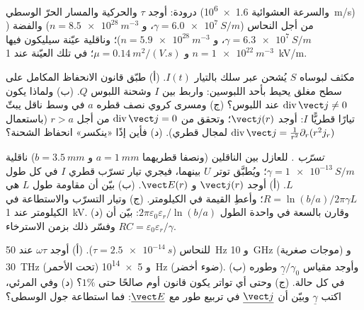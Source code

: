 \begin{exercise}[$\star$]\label{exo:b2:charges-currents-conduction:4}
درودة: أوجد $\tau$ والحركية والمسار الحرّ الوسطي (والسرعة العشوائية \qty{1.6e6}{m/s})
من أجل النحاس ($\gamma = \qty{6.0e7}{S/m}$، و $n = \qty{8.5e28}{m^{-3}}$) والفضة
($\gamma = \qty{6.3e7}{S/m}$، و $n = \qty{5.9e28}{m^{-3}}$)؛ وناقلية عيّنة
سيليكون فيها $n = \qty{1e22}{m^{-3}}$ و $\mu = \qty{0.14}{m^2/(V.s)}$؛
 في تلك العيّنة عند \qty{1}{kV/m}.
\end{exercise}

\begin{exercise}[$\star\star$]\label{exo:b2:charges-currents-conduction:5}
مكثف لبوساه $S$ يُشحن عبر سلك بالتيار $I(t)$. (أ) طبّق
قانون الانحفاظ المكامل على سطح مغلق يحيط بأحد اللبوسين:
واربط بين $I$ وشحنة اللبوس $Q$. (ب) ولماذا يكون $\operatorname{div}\vect j \ne 0$
عند اللبوس؟ (ج) ومسرى كروي نصف قطره $a$ في وسط ناقل
يبثّ تيارًا قطريًّا $I$: أوجد $\vect j(r)$؛ وتحقق من $\operatorname{div}
\vect j = 0$ من أجل $r > a$ (باستعمال $\operatorname{div}\vect j = \frac1{r^2}\partial_r(r^2j_r)$
لمجال قطري). (د) فأين إذًا «ينكسر» انحفاظ
الشحنة؟
\end{exercise}

\begin{exercise}[$\star\star$]\label{exo:b2:charges-currents-conduction:6}
\emph{تسرّب .} للعازل بين الناقلين
(ونصفا قطريهما $a = \qty{1}{mm}$ و $b = \qty{3.5}{mm}$) ناقلية $\gamma = \qty{1e-13}{S/m}$؛
ويُطبَّق توتر $U$ بينهما، فيجري تيار تسرّب قطري $I$
في كل طول $L$. (أ) أوجد $\vect j(r)$ و $\vect E(r)$. (ب) بيّن أن
مقاومة طول $L$ هي $R = \ln(b/a)/2\pi\gamma L$؛ وأعطِ القيمة في
الكيلومتر. (ج) وتيار التسرّب والاستطاعة في الكيلومتر عند \qty{1}{kV}.
(د) وقارن بالسعة في واحدة الطول $2\pi\varepsilon_0\varepsilon_r/\ln(b/a)$:
بيّن أن $RC = \varepsilon_0\varepsilon_r/\gamma$ وفسّر ذلك بزمن الاسترخاء.
\end{exercise}

\begin{exercise}[$\star\star$]\label{exo:b2:charges-currents-conduction:7}
 للنحاس ($\tau = \qty{2.5e-14}{s}$). (أ) أوجد $\omega\tau$ عند
\qty{50}{Hz} و \qty{10}{GHz} (موجات صغرية) و \qty{30}{THz} (تحت الأحمر) و \qty{5e14}{Hz}
(ضوء أخضر). (ب) وأوجد مقياس $\underline\gamma/\gamma_0$ وطوره في كل حالة.
(ج) وحتى أي تواتر يكون قانون أوم صالحًا حتى $1\%$؟ (د) وفي المرئي،
اكتب $\underline\gamma$ وبيّن أن $\underline{\vect j}$ في تربيع طور مع
$\underline{\vect E}$: فما استطاعة جول الوسطى؟
\end{exercise}

